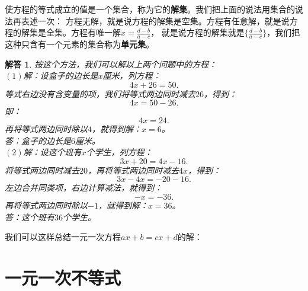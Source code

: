 \documentclass[12pt,UTF8]{ctexbook}
\newtheorem*{so}{解答}
\begin{document}
使方程的等式成立的值是一个集合，称为它的\textbf{解集}。我们把上面的说法用集合的说法再表述一次：
方程无解，就是说方程的解集是空集。方程有任意解，就是说方程的解集是全集。方程有唯一解$x = \frac{d-b}{a-c}$，
就是说方程的解集就是$\{\frac{d-b}{a-c}\}$，我们把这种只含有一个元素的集合称为\textbf{单元集}。
\begin{so}
    按这个方法，我们可以解以上两个问题中的方程：\\
    $(1)$解：设盒子的边长是$x$厘米，列方程：
    $$ 4x + 26 = 50.$$
    等式右边没有含变量的项，我们将等式两边同时减去$26$，得到：
    $$ 4x = 50 - 26.$$
    即：
    $$ 4x = 24. $$
    再将等式两边同时除以$4$，就得到解：$x=6$。\\
    答：盒子的边长是$6$厘米。\\
    $(2)$解：设这个班有$x$个学生，列方程：
    $$ 3x + 20 = 4x - 16.$$
    将等式两边同时减去$20$，再将等式两边同时减去$4x$，得到：
    $$ 3x - 4x = -20 - 16.$$
    左边合并同类项，右边计算减法，就得到：
    $$ -x = -36. $$
    再将等式两边同时除以$-1$，就得到解：$x = 36$。\\
    答：这个班有$36$个学生。
\end{so}
我们可以这样总结一元一次方程$ax+b=cx+d$的解：
\begin{center}
\end{center}

\section{一元一次不等式}
\end{document}
